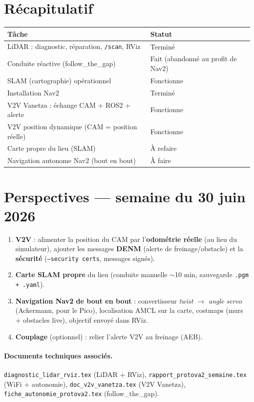 \documentclass[a4paper,11pt]{article}
\begin{document}
\section{Récapitulatif}
\begin{center}
\begin{tabularx}{\textwidth}{@{}X l@{}}
\toprule
\textbf{Tâche} & \textbf{Statut} \\
\midrule
LiDAR : diagnostic, réparation, \texttt{/scan}, RViz & \textcolor{success}{Terminé} \\
Conduite réactive (follow\_the\_gap) & \textcolor{success}{Fait} (abandonné au profit de Nav2) \\
SLAM (cartographie) opérationnel & \textcolor{success}{Fonctionne} \\
Installation Nav2 & \textcolor{success}{Terminé} \\
V2V Vanetza : échange CAM + ROS2 + alerte & \textcolor{success}{Fonctionne} \\
V2V position dynamique (CAM = position réelle) & \textcolor{success}{Fonctionne} \\
Carte propre du lieu (SLAM) & \textcolor{warning}{À refaire} \\
Navigation autonome Nav2 (bout en bout) & \textcolor{warning}{À faire} \\
\bottomrule
\end{tabularx}
\end{center}

\section{Perspectives --- semaine du 30 juin 2026}
\begin{enumerate}[leftmargin=1.6em, nosep]
  \item \textbf{V2V} : alimenter la position du CAM par l'\textbf{odométrie réelle}
        (au lieu du simulateur), ajouter les messages \textbf{DENM} (alerte de
        freinage/obstacle) et la \textbf{sécurité} (\texttt{--security certs},
        messages signés).
  \item \textbf{Carte SLAM propre} du lieu (conduite manuelle $\sim$10 min,
        sauvegarde \texttt{.pgm + .yaml}).
  \item \textbf{Navigation Nav2 de bout en bout} : convertisseur
        \emph{twist $\rightarrow$ angle servo} (Ackermann, pour le Pico),
        localisation AMCL sur la carte, costmaps (murs + obstacles live),
        objectif envoyé dans RViz.
  \item \textbf{Couplage} (optionnel) : relier l'alerte V2V au freinage (AEB).
\end{enumerate}

\paragraph{Documents techniques associés.}
\texttt{diagnostic\_lidar\_rviz.tex} (LiDAR + RViz), \texttt{rapport\_protova2\_semaine.tex}
(WiFi + autonomie), \texttt{doc\_v2v\_vanetza.tex} (V2V Vanetza),
\texttt{fiche\_autonomie\_protova2.tex} (follow\_the\_gap).
\end{document}
